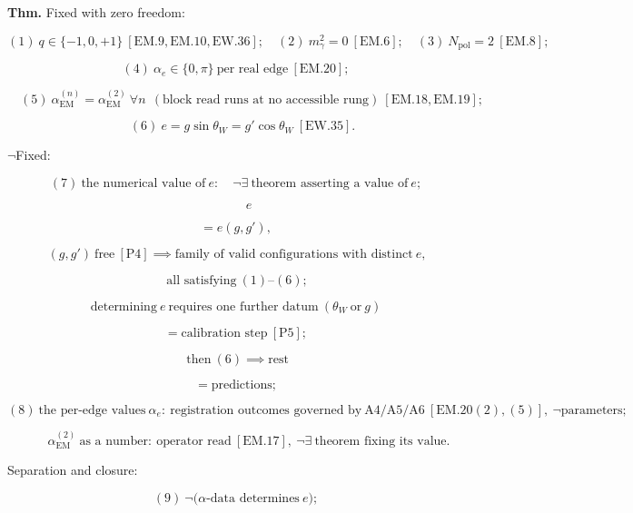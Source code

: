 \begin{theorem}\label{tag:EM-25}
\textbf{Thm.} Fixed with zero freedom:

\[
(1)\ q\in\{-1,0,+1\}\ [\mathrm{EM.9},\mathrm{EM.10},\mathrm{EW.36}];\quad
(2)\ m_\gamma^2=0\ [\mathrm{EM.6}];\quad
(3)\ N_{\mathrm{pol}}=2\ [\mathrm{EM.8}];
\]

\[
(4)\ \alpha_e\in\{0,\pi\}\ \text{per real edge}\ [\mathrm{EM.20}];
\]

\[
\quad (5)\ \alpha_{\mathrm{EM}}^{(n)}=\alpha_{\mathrm{EM}}^{(2)}\ \forall n\ \ (\text{block read runs at no accessible rung})\ [\mathrm{EM.18},\mathrm{EM.19}];
\]

\[
\quad (6)\ e=g\sin\theta_W=g'\cos\theta_W\ [\mathrm{EW.35}].
\]

$\neg$Fixed:

\[
(7)\ \text{the numerical value of}\ e:\quad
\neg\exists\ \text{theorem asserting a value of}\ e;
\]

\[
\qquad e
\]

\[
= e(g,g'),
\]

\[
\ (g,g')\ \text{free}\ [\mathrm{P4}]\implies\text{family of valid configurations with distinct}\ e,
\]

\[
\ \text{all satisfying}\ (1)\text{--}(6);
\]

\[
\text{determining}\ e\ \text{requires one further datum}\ (\theta_W\ \text{or}\ g)
\]

\[
= \text{calibration step}\ [\mathrm{P5}];
\]

\[
\ \text{then}\ (6)\implies\text{rest}
\]

\[
= \text{predictions};
\]

\[
(8)\ \text{the per-edge values}\ \alpha_e:\ \text{registration outcomes governed by}\ \mathrm{A4}/\mathrm{A5}/\mathrm{A6}\ [\mathrm{EM.20}(2),(5)],\ \neg\text{parameters};
\]

\[
\qquad \alpha_{\mathrm{EM}}^{(2)}\ \text{as a number}:\ \text{operator read}\ [\mathrm{EM.17}],\ \neg\exists\ \text{theorem fixing its value}.
\]

Separation and closure:

\[
(9)\ \neg\bigl(\alpha\text{-data determines}\ e\bigr);
\]


\end{theorem}
